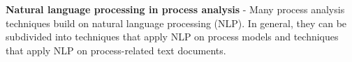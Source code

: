 \textbf{Natural language processing in process analysis} - Many process analysis techniques build on natural language processing (NLP). In general, they can be subdivided into techniques that apply NLP on process models and techniques that apply NLP on process-related text documents. 

%


